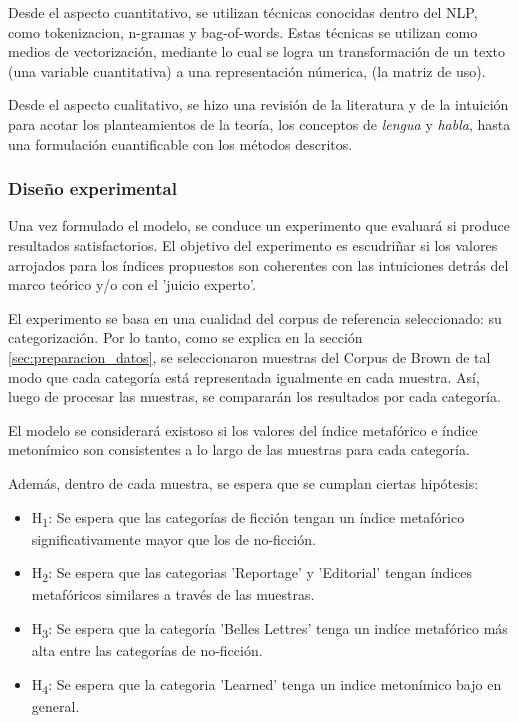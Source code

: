 \documentclass[12pt,letterpaper,twoside]{article}
\begin{document}
Desde el aspecto cuantitativo, se utilizan técnicas conocidas
dentro del NLP, como tokenizacion, n-gramas y  bag-of-words.
Estas técnicas se utilizan como medios de vectorización, mediante
lo cual se logra un transformación de un texto (una variable cuantitativa)
a una representación númerica, (la matriz de uso).

Desde el aspecto cualitativo, se hizo una revisión de la literatura y de la intuición
para acotar los planteamientos de la teoría, los conceptos de \emph{lengua} y \emph{habla}, hasta
una formulación cuantificable con los métodos descritos.




\subsubsection{Diseño experimental}
\label{sec:org284dcbe}

Una vez formulado el modelo, se conduce un experimento que evaluará si produce resultados
satisfactorios. El objetivo del experimento es escudriñar si los valores arrojados para
los índices propuestos son coherentes con las intuiciones detrás del marco teórico y/o
con el 'juicio experto'.

El experimento se basa en una cualidad del corpus de referencia seleccionado: su categorización.
Por lo tanto, como se explica en la sección \ref{sec:preparacion_datos}, se seleccionaron
muestras del Corpus de Brown  de tal modo que cada categoría está representada igualmente
en cada muestra. Así, luego de procesar las muestras, se compararán los resultados por
cada categoría.

El modelo se considerará existoso si los valores del índice metafórico e índice metonímico
son consistentes a lo largo de las muestras para cada categoría.

Además, dentro de cada muestra, se espera que se cumplan ciertas hipótesis:

\begin{itemize}
\item H\textsubscript{1}: Se espera que las categorías de ficción tengan un índice metafórico significativamente mayor que los de no-ficción.
\item H\textsubscript{2}: Se espera que las categorias 'Reportage' y 'Editorial' tengan índices metafóricos similares a través de las muestras.
\item H\textsubscript{3}: Se espera que la categoría 'Belles Lettres' tenga un indíce metafórico más alta entre las categorías de no-ficción.
\item H\textsubscript{4}: Se espera que la categoria 'Learned' tenga un indice metonímico bajo en general.
\end{itemize}
\end{document}
